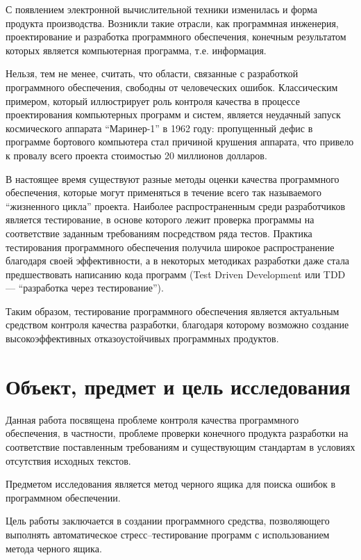 \documentclass[a4paper,14pt,href]{article}
\begin{document}
  С появлением электронной вычислительной техники изменилась и форма продукта производства. Возникли такие отрасли, как программная инженерия, проектирование и разработка программного обеспечения, конечным результатом которых является компьютерная программа, т.е. информация.
  
  Нельзя, тем не менее, считать, что области, связанные с разработкой программного обеспечения, свободны от человеческих ошибок. Классическим примером, который иллюстрирует роль контроля качества в процессе проектирования компьютерных программ и систем, является неудачный запуск космического аппарата ``Маринер-1'' в 1962 году: пропущенный дефис в программе бортового компьютера стал причиной крушения аппарата, что привело к провалу всего проекта стоимостью 20 миллионов долларов\cite{Mariner}.
  
  В настоящее время существуют разные методы оценки качества программного обеспечения, которые могут применяться в течение всего так называемого ``жизненного цикла'' проекта. Наиболее распространенным среди разработчиков является тестирование, в основе которого лежит проверка программы на соответствие заданным требованиям посредством ряда тестов. Практика тестирования программного обеспечения получила широкое распространение благодаря своей эффективности, а в некоторых методиках разработки даже стала предшествовать написанию кода программ (Test Driven Development или TDD --- ``разработка через тестирование''\cite{ExtremeProgramming}).
  
  Таким образом, тестирование программного обеспечения является актуальным средством контроля качества разработки, благодаря которому возможно создание высокоэффективных отказоустойчивых программных продуктов.
  
\section*{Объект, предмет и цель исследования}
	Данная работа посвящена проблеме контроля качества программного обеспечения, в частности, проблеме проверки конечного продукта разработки на соответствие поставленным требованиям и существующим стандартам в условиях отсутствия исходных текстов.

	Предметом исследования является метод черного ящика для поиска ошибок в программном обеспечении.	
  	
	Цель работы заключается в создании программного средства, позволяющего выполнять автоматическое стресс--тестирование программ с использованием метода черного ящика. 
  
\end{document}
